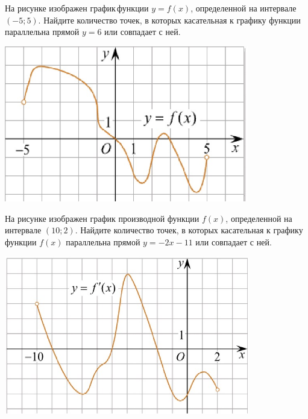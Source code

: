 \begin{listofex}
\begin{minipage}[c]{0.3\textwidth}
	\end{minipage}
	\item \begin{minipage}[t]{0.66\textwidth}
		На рисунке изображен график функции \(y = f(x)\), определенной на интервале \((-5; 5)\). Найдите количество точек, в которых касательная к графику функции параллельна прямой \(y = 6\) или совпадает с ней.
	\end{minipage}
	\begin{minipage}[c]{0.3\textwidth}
		\includegraphics[align=b, width=0.8\textwidth]{pics/G111M3H2-2}
	\end{minipage}
	\item \begin{minipage}[t]{0.66\textwidth}
		На рисунке изображен график производной функции \(f(x)\), определенной на интервале \((10; 2)\). Найдите количество точек, в которых касательная к графику функции \(f(x)\) параллельна прямой \(y =-2x-11\) или совпадает с ней.
	\end{minipage}
	\begin{minipage}[c]{0.3\textwidth}
		\includegraphics[align=t, width=0.8\textwidth]{pics/G111M3H2-3}
	\end{minipage}
	\item \begin{minipage}[t]{0.66\textwidth}

\end{minipage}
\end{listofex}
